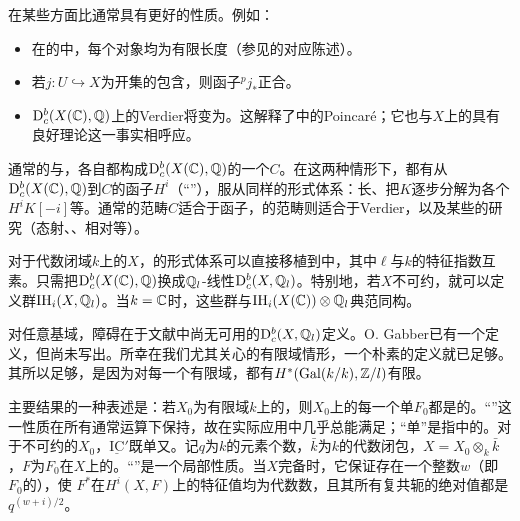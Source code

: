 在某些方面比通常具有更好的性质。例如：
\begin{itemize}
\item 在的中，每个对象均为有限长度（参见的对应陈述）。
\item 若$j:U\hookrightarrow X$为开集的包含，则函子${}^pj_*$正合。
\item $\mathrm{D}_c^b(X(\mathbb C),\mathbb Q)$上的Verdier将变为。这解释了中的Poincaré；它也与$X$上的具有良好理论这一事实相呼应。
\end{itemize}
通常的与，各自都构成$\mathrm{D}_c^b(X(\mathbb C),\mathbb Q)$的一个$C$。在这两种情形下，都有从$\mathrm{D}_c^b(X(\mathbb C),\mathbb Q)$到$C$的函子$H^i$（“”），服从同样的形式体系：长、把$K$逐步分解为各个$H^iK[-i]$等。通常的范畴$C$适合于函子，的范畴则适合于Verdier，以及某些的研究（态射、、相对等）。

对于代数闭域$k$上的$X$，的形式体系可以直接移植到中，其中$\ell$与$k$的特征指数互素。只需把$\mathrm{D}_c^b(X(\mathbb C),\mathbb Q)$换成$\mathbb Q_l$-线性$\mathrm{D}_c^b(X,\mathbb Q_l)$。特别地，若$X$不可约，就可以定义群$\mathrm{IH}_i(X,\mathbb Q_l)$。当$k=\mathbb C$时，这些群与$\mathrm{IH}_i(X(\mathbb C))\otimes\mathbb Q_l$典范同构。

对任意基域，障碍在于文献中尚无可用的$\mathrm{D}_c^b(X,\mathbb Q_l)$定义。O. Gabber已有一个定义，但尚未写出。所幸在我们尤其关心的有限域情形，一个朴素的定义就已足够。其所以足够，是因为对每一个有限域，都有$H^*(\operatorname{Gal}(\relax k/k),\mathbb Z/l)$有限。

主要结果的一种表述是：若$X_0$为有限域$k$上的，则$X_0$上的每一个单$F_0$都是的。“”这一性质在所有通常运算下保持，故在实际应用中几乎总能满足；“单”是指中的。对于不可约的$X_0$，$\underline{\mathrm{IC}}'$既单又。记$q$为$k$的元素个数，$\bar k$为$k$的代数闭包，$X=X_0\otimes_k\bar k$，$F$为$F_0$在$X$上的。“”是一个局部性质。当$X$完备时，它保证存在一个整数$w$（即$F_0$的），使 $F^*$在$H^i(X,F)$上的特征值均为代数数，且其所有复共轭的绝对值都是$q^{(w+i)/2}$。

